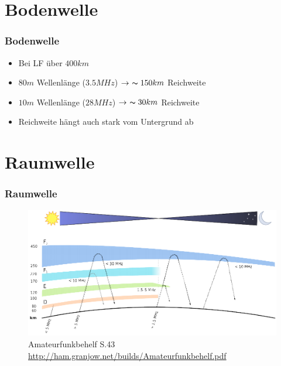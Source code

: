 \section*{Bodenwelle}
\begin{frame}
    \frametitle{Bodenwelle}
    \begin{itemize}
      \item Bei LF über $400km$
      \item $80m$ Wellenlänge ($3.5MHz$) $\rightarrow~\thicksim150km$ Reichweite
      \item $10m$ Wellenlänge ($28MHz$) $\rightarrow~\thicksim30km$ Reichweite
      \item Reichweite hängt auch stark vom Untergrund ab
    \end{itemize}
\end{frame}

\section*{Raumwelle}
    
\begin{frame}
    \frametitle{Raumwelle}
    \begin{center}
      \begin{figure}
        \includegraphics[width=\textwidth,height=.75\textheight,keepaspectratio]{e09/schichten_behelf_43.png}
        \caption{Amateurfunkbehelf S.43 \ExternalLink \url{http://ham.granjow.net/builds/Amateurfunkbehelf.pdf}}
      \end{figure}
    \end{center}
\end{frame}

